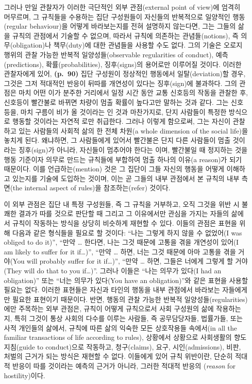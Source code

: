 그러나 만일 관찰자가 이러한 극단적인 외부 관점(external point of view)에
엄격히 머무르며, 그 규칙들을 수용하는 집단 구성원들이 자신들의
반복적으로 일양적인 행동(regular behaviour)을 어떻게 바라보는지를 전혀
설명하지 않는다면, 그는 그들의 삶을 규칙의 관점에서 기술할 수 없으며,
따라서 규칙에 의존하는 관념들(notions), 즉 의무(obligation)나
책무(duty)에 대한 관념들을 사용할 수도 없다. 그의 기술은 오로지 행위의
관찰 가능한 반복적 일양성들(observable regularities of conduct),
예측(predictions), 확률(probabilities), 징후(signs)의 용어로만 이루어질
것이다. 이러한 관찰자에게 있어, \textbf{(p.~90)} 집단 구성원이 정상적인
행동에서 일탈(deviation)할 경우, 그것은 그저 적대적인 반응이 뒤따를
개연성이 있다는 징후(sign)에 불과하다. 그의 관점은 마치 어떤 이가 분주한
거리에서 일정 시간 동안 교통 신호등의 작동을 관찰한 후, 신호등이
빨간불로 바뀌면 차량이 멈출 확률이 높다고만 말하는 것과 같다. 그는
신호등을, 마치 구름이 비가 올 것이라는 인 것과
마찬가지로, 단지 사람들이 특정한 방식으로 행동할 것이라는 자연적
로만 취급한다. 그러나 이렇게 함으로써,
그는 자신이 관찰하고 있는 사람들의 사회적 삶의 한 전체 차원(a whole
dimension of the social life)을 놓치게 된다. 왜냐하면, 그 사람들에게
있어서 빨간불은 단지 다른 사람들이 멈출 것이라는 징후(sign)가 아니라,
자신들이 멈추어야 한다는 이며,
빨간불일 때 정지하는 것을 행동 기준이자 의무로 만드는 규칙들에 부합하여
멈출 하나의 이유(a reason)가 되기 때문이다. 이를 언급하는(mention) 것은
그 집단이 그들 자신의 행동을 어떻게 이해하고 있는지를 기술에 도입하는
것이며, 이는 곧 그들의 내부 관점에서 본 규칙의 내부 측면(the internal
aspect of rules)을 참조하는(refer) 것이다.

이 외부 관점은 집단 내 특정 구성원들, 즉 그 규칙을 거부하고, 오직 그것을
위반 시 불쾌한 결과가 따를 것으로 판단할 때 그리고 그 이유에서만 관심을
가지는 자들의 삶에서 규칙이 작동하는 방식을 상당히 비슷하게 재현할 수
있다. 이들의 관점은 표현을 위해 다음과 같은 형식들을 필요로 할 것이다:
“나는 그렇게 하지 않을 수 없었어(I was obliged to do it)”, “만약
\ldots{} 한다면, 나는 그것 때문에 고통을 겪을 개연성이 있어(I am likely
to suffer for it if\ldots)”, “만약 \ldots{} 하면, 너는 그것 때문에
아마 고통을 겪을 거야(You will probably suffer for it if\ldots)”,
“만약 \ldots{} 하면, 그들은 너에게 그렇게 할 거야(They will do that to
you if\ldots)”. 그러나 이들은 “나는 의무가 있다(I had an obligation)”
또는 “너는 의무가 있다(You have an obligation)”와 같은 표현을 사용할
필요는 없다. 이러한 표현들은 자신과 타인의 행동을 내부 관점에서 바라보는
자들에게만 필요한 표현이기 때문이다. 반면, 행동의 관찰 가능한 반복적
일양성들(regularities)에만 주목하는 외부 관점은, 규칙이 어떻게
규칙으로서 사회 구성원의 삶에 작용하는지, 특히 그것이 통상 사회의 다수를
이루는 사람들, 즉 공무담당자들, 법률가들, 또는 사적 개인들의 삶에서,
규칙에 따른 삶의 익숙한 모든 상호작용들 속에서(in all the familiar
transactions of life according to rules), 상황에서 상황으로 사회생활의
향도지침(guide to conduct)으로 작동하고, 청구(claims), 요구,
시인(admissions), 비판, 처벌의 근거가 되는 방식은 재현할 수 없다.
이들에게 있어 규칙 위반이란, 단순히 적대적 반응이 따를 것이라는 예측의
근거가 아니라, 그러한 적대적 반응의 (\emph{reason} for
hostility)이다.

